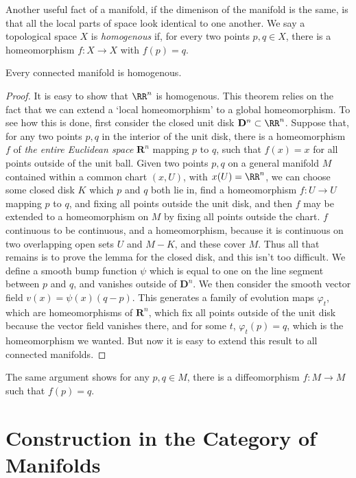 Another useful fact of a manifold, if the dimenison of the manifold is the same, is that all the local parts of space look identical to one another. We say a topological space $X$ is \emph{homogenous} if, for every two points $p,q \in X$, there is a homeomorphism $f: X \to X$ with $f(p) = q$.

\begin{theorem}
    Every connected manifold is homogenous.
\end{theorem}
\begin{proof}
    It is easy to show that $\RR^n$ is homogenous. This theorem relies on the fact that we can extend a `local homeomorphism' to a global homeomorphism. To see how this is done, first consider the closed unit disk $\mathbf{D}^n \subset \RR^n$. Suppose that, for any two points $p,q$ in the interior of the unit disk, there is a homeomorphism $f$ of {\it the entire Euclidean space} $\mathbf{R}^n$ mapping $p$ to $q$, such that $f(x) = x$ for all points outside of the unit ball. Given two points $p,q$ on a general manifold $M$ contained within a common chart $(x,U)$, with $x(U) = \RR^n$, we can choose some closed disk $K$ which $p$ and $q$ both lie in, find a homeomorphism $f: U \to U$ mapping $p$ to $q$, and fixing all points outside the unit disk, and then $f$ may be extended to a homeomorphism on $M$ by fixing all points outside the chart. $f$ continuous to be continuous, and a homeomorphism, because it is continuous on two overlapping open sets $U$ and $M - K$, and these cover $M$. Thus all that remains is to prove the lemma for the closed disk, and this isn't too difficult. We define a smooth bump function $\psi$ which is equal to one on the line segment between $p$ and $q$, and vanishes outside of $\mathbf{D}^n$. We then consider the smooth vector field $v(x) = \psi(x)(q - p)$. This generates a family of evolution maps $\varphi_t$, which are homeomorphisms of $\mathbf{R}^n$, which fix all points outside of the unit disk because the vector field vanishes there, and for some $t$, $\varphi_t(p) = q$, which is the homeomorphism we wanted. But now it is easy to extend this result to all connected manifolds.
\end{proof}

\begin{remark}
    The same argument shows for any $p,q \in M$, there is a diffeomorphism $f: M \to M$ such that $f(p) = q$.
\end{remark}

\section{Construction in the Category of Manifolds}

